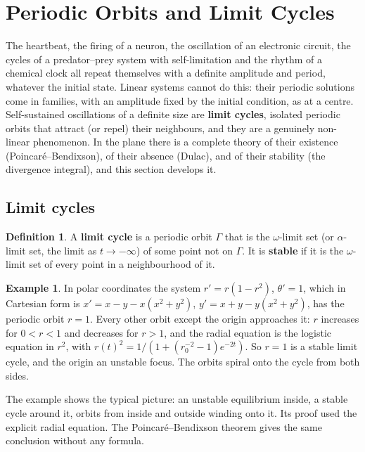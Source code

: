 \documentclass[11pt,a4paper]{article}
\numberwithin{equation}{section}
\theoremstyle{definition}
\newtheorem{defn}[thm]{Definition}
\newtheorem{exa}[thm]{Example}
\begin{document}
\section{Periodic Orbits and Limit Cycles}
\label{sec:limitcycles}

The heartbeat, the firing of a neuron, the oscillation of an electronic circuit, the cycles of a predator--prey system with self-limitation and the
rhythm of a chemical clock all repeat themselves with a definite amplitude and period, whatever the initial state. Linear systems cannot do this: their
periodic solutions come in families, with an amplitude fixed by the initial condition, as at a centre. Self-sustained oscillations of a definite size
are \textbf{limit cycles}, isolated periodic orbits that attract (or repel) their neighbours, and they are a genuinely non-linear phenomenon. In the plane
there is a complete theory of their existence (Poincar\'e--Bendixson), of their absence (Dulac), and of their stability (the divergence integral), and
this section develops it.

\subsection{Limit cycles}
\label{ssec:lc}

\begin{defn}
A \textbf{limit cycle} is a periodic orbit $\Gamma$ that is the $\omega$-limit set (or $\alpha$-limit set, the limit as $t \to -\infty$) of some point not on $\Gamma$. It is \textbf{stable} if it is the $\omega$-limit set of every
point in a neighbourhood of it.
\end{defn}

\begin{exa}
\label{ex:polarcycle}
In polar coordinates the system $r' = r(1 - r^2)$, $\theta' = 1$, which in Cartesian form is $x' = x - y - x(x^2 + y^2)$, $y' = x + y - y(x^2 + y^2)$, has the periodic orbit $r = 1$. Every other orbit
except the origin approaches it: $r$ increases for $0 < r < 1$ and decreases for $r > 1$, and the radial equation is the logistic equation in $r^2$, with $r(t)^2 = 1/(1 + (r_0^{-2} - 1)e^{-2t})$. So $r = 1$ is a stable limit
cycle, and the origin an unstable focus. The orbits spiral onto the cycle from both sides.
\end{exa}

The example shows the typical picture: an unstable equilibrium inside, a stable cycle around it, orbits from inside and outside winding onto it. Its proof used the explicit radial
equation. The Poincar\'e--Bendixson theorem gives the same conclusion without any formula.
\end{document}
